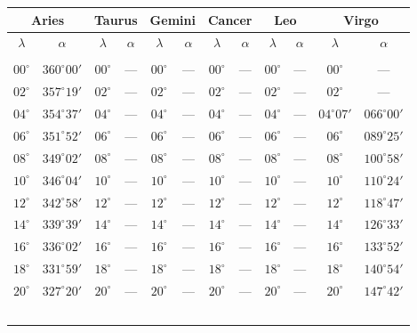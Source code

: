 \clearpage
\begin{table}[!h]
\vspace{0.25cm}
\centering
{\scriptsize\begin{tabular}{cc|cc|cc|cc|cc|cc}
\multicolumn{2}{c}{Aries}\vline & \multicolumn{2}{c}{Taurus} \vline& \multicolumn{2}{c}{Gemini} \vline& \multicolumn{2}{c}{Cancer}\vline &
\multicolumn{2}{c}{Leo}\vline & \multicolumn{2}{c}{Virgo}\\\hline
$\lambda$& $\alpha$& $\lambda$& $\alpha$& $\lambda$& $\alpha$& $\lambda$& $\alpha$& $\lambda$& $\alpha$& $\lambda$& $\alpha$\\\hline
&&&&&&&&&&&\\[-2ex]
$00^\circ$ & $360^\circ00'$ & $00^\circ$ & --- & $00^\circ$ & --- & $00^\circ$ & --- & $00^\circ$ & --- & $00^\circ$ & ---\\
$02^\circ$ & $357^\circ19'$ & $02^\circ$ & --- & $02^\circ$ & --- & $02^\circ$ & --- & $02^\circ$ & --- & $02^\circ$ & ---\\
$04^\circ$ & $354^\circ37'$ & $04^\circ$ & --- & $04^\circ$ & --- & $04^\circ$ & --- & $04^\circ$ & --- & $04^\circ$$07'$ & $066^\circ00'$\\
$06^\circ$ & $351^\circ52'$ & $06^\circ$ & --- & $06^\circ$ & --- & $06^\circ$ & --- & $06^\circ$ & --- & $06^\circ$ & $089^\circ25'$\\
$08^\circ$ & $349^\circ02'$ & $08^\circ$ & --- & $08^\circ$ & --- & $08^\circ$ & --- & $08^\circ$ & --- & $08^\circ$ & $100^\circ58'$\\
$10^\circ$ & $346^\circ04'$ & $10^\circ$ & --- & $10^\circ$ & --- & $10^\circ$ & --- & $10^\circ$ & --- & $10^\circ$ & $110^\circ24'$\\
$12^\circ$ & $342^\circ58'$ & $12^\circ$ & --- & $12^\circ$ & --- & $12^\circ$ & --- & $12^\circ$ & --- & $12^\circ$ & $118^\circ47'$\\
$14^\circ$ & $339^\circ39'$ & $14^\circ$ & --- & $14^\circ$ & --- & $14^\circ$ & --- & $14^\circ$ & --- & $14^\circ$ & $126^\circ33'$\\
$16^\circ$ & $336^\circ02'$ & $16^\circ$ & --- & $16^\circ$ & --- & $16^\circ$ & --- & $16^\circ$ & --- & $16^\circ$ & $133^\circ52'$\\
$18^\circ$ & $331^\circ59'$ & $18^\circ$ & --- & $18^\circ$ & --- & $18^\circ$ & --- & $18^\circ$ & --- & $18^\circ$ & $140^\circ54'$\\
$20^\circ$ & $327^\circ20'$ & $20^\circ$ & --- & $20^\circ$ & --- & $20^\circ$ & --- & $20^\circ$ & --- & $20^\circ$ & $147^\circ42'$\\
$$
\end{tabular}}
\end{table}
